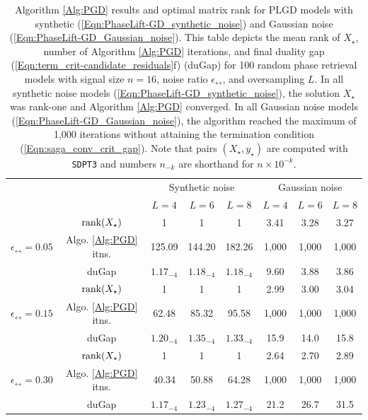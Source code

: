 \begin{enumerate}
\begin{table}[H]
\centering 
\begin{tabular}{ |cc|c|c|c|c|c|c| }
\hline
	\multicolumn{2}{|c|}{} &	\multicolumn{3}{c|}{Synthetic noise} 	&	\multicolumn{3}{c|}{Gaussian noise}  \\
\multicolumn{2}{|c|}{}  	&	\multicolumn{1}{c}{$L = 4$}	&	\multicolumn{1}{c}{$L = 6$}	&	\multicolumn{1}{c|}{$L = 8$} &	\multicolumn{1}{c}{$L = 4$}	&	\multicolumn{1}{c}{$L = 6$}	&	\multicolumn{1}{c|}{$L = 8$}		\\
\hline
& $\textnormal{rank}(X_\star)$
	&	1	&	1	&	1	&	3.41 	&	3.28 	&	3.27 \\
$\epsilon_\rel = 0.05$ &	 Algo. \ref{Alg:PGD} itns.
	&	125.09	&	144.20 & 182.26	&	1,000	&	1,000	&	1,000\\
& 	duGap
	&	$1.17_{-4}$  &  $1.18_{-4}$ &  $1.18_{-4}$ 	&	9.60   & 3.88   & 3.86\\
\hline
& $\textnormal{rank}(X_\star)$
	&	1	&	1	&	1	&	2.99 	&	3.00 &	3.04 \\
$\epsilon_\rel = 0.15$ &	 Algo. \ref{Alg:PGD} itns.
	&	62.48  & 85.32 &  95.58	&	1,000	&	1,000	&	1,000\\
& 	duGap
	&	$1.20_{-4}$ &  $1.35_{-4}$ &  $1.33_{-4}$ &	15.9 &  14.0 &  15.8 \\
\hline
& $\textnormal{rank}(X_\star)$
	&	1	&	1	&	1	&	2.64  	&	2.70  &	2.89\\
$\epsilon_\rel = 0.30$ &	 Algo. \ref{Alg:PGD} itns.
	&	40.34  & 50.88  & 64.28	&	1,000	&	1,000	&	1,000\\
& 	duGap
	&	$1.17_{-4}$ &  $1.23_{-4}$ &  $1.27_{-4}$		&	   21.2 &  26.7  & 31.5\\
 \hline
\end{tabular}

\caption{Algorithm \ref{Alg:PGD} results and optimal matrix rank for PLGD models with synthetic (\ref{Eqn:PhaseLift-GD_synthetic_noise}) and Gaussian noise (\ref{Eqn:PhaseLift-GD_Gaussian_noise}).  This table depicts the mean rank of $X_\star$, number of Algorithm \ref{Alg:PGD} iterations, and final duality gap (\ref{Eqn:term_crit-candidate_residuals}f) (duGap) for 100 random phase retrieval models with signal size $n=16$, noise ratio $\epsilon_\rel$, and oversampling $L$.  In all synthetic noise models (\ref{Eqn:PhaseLift-GD_synthetic_noise}), the solution $X_\star$ was rank-one and Algorithm \ref{Alg:PGD} converged.  In all Gaussian noise models (\ref{Eqn:PhaseLift-GD_Gaussian_noise}), the algorithm reached the maximum of 1,000 iterations without attaining the termination condition (\ref{Eqn:saga_conv_crit_gap}).  Note that pairs $(X_\star, y_\star)$ are computed with \texttt{SDPT3} and numbers $n_{-k}$ are shorthand for $n \times 10^{-k}$.} \label{Tab:average_rank_soln_matrix_with_gaussian_dual_variable}
\end{table}



\end{enumerate}

